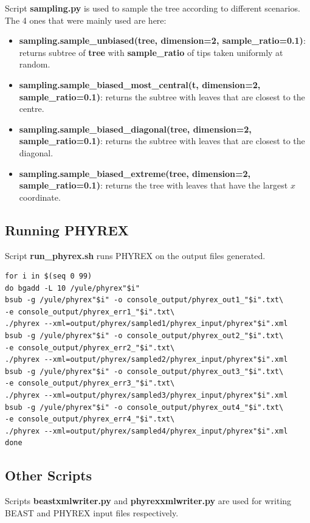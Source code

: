 Script \textbf{sampling.py} is used to sample the tree according to different scenarios. The 4 ones that were mainly used are here:

\begin{itemize}
\item \textbf{sampling.sample\_unbiased(tree, dimension=2, sample\_ratio=0.1)}: returns subtree of \textbf{tree} with \textbf{sample\_ratio} of tips taken uniformly at random.

\item \textbf{sampling.sample\_biased\_most\_central(t, dimension=2, sample\_ratio=0.1)}: returns the subtree with leaves that are closest to the centre.

\item \textbf{sampling.sample\_biased\_diagonal(tree, dimension=2, sample\_ratio=0.1)}: returns the subtree with leaves that are closest to the diagonal.

\item \textbf{sampling.sample\_biased\_extreme(tree, dimension=2, sample\_ratio=0.1)}: returns the tree with leaves that have the largest $x$ coordinate.
\end{itemize}

\subsection*{Running PHYREX}

Script \textbf{run\_phyrex.sh} runs PHYREX on the output files generated.

\begin{verbatim}
for i in $(seq 0 99)
do bgadd -L 10 /yule/phyrex"$i"
bsub -g /yule/phyrex"$i" -o console_output/phyrex_out1_"$i".txt\
-e console_output/phyrex_err1_"$i".txt\
./phyrex --xml=output/phyrex/sampled1/phyrex_input/phyrex"$i".xml
bsub -g /yule/phyrex"$i" -o console_output/phyrex_out2_"$i".txt\
-e console_output/phyrex_err2_"$i".txt\
./phyrex --xml=output/phyrex/sampled2/phyrex_input/phyrex"$i".xml
bsub -g /yule/phyrex"$i" -o console_output/phyrex_out3_"$i".txt\
-e console_output/phyrex_err3_"$i".txt\
./phyrex --xml=output/phyrex/sampled3/phyrex_input/phyrex"$i".xml
bsub -g /yule/phyrex"$i" -o console_output/phyrex_out4_"$i".txt\
-e console_output/phyrex_err4_"$i".txt\
./phyrex --xml=output/phyrex/sampled4/phyrex_input/phyrex"$i".xml
done
\end{verbatim}

\subsection*{Other Scripts}
Scripts \textbf{beastxmlwriter.py} and \textbf{phyrexxmlwriter.py} are used for writing BEAST and PHYREX input files respectively.

